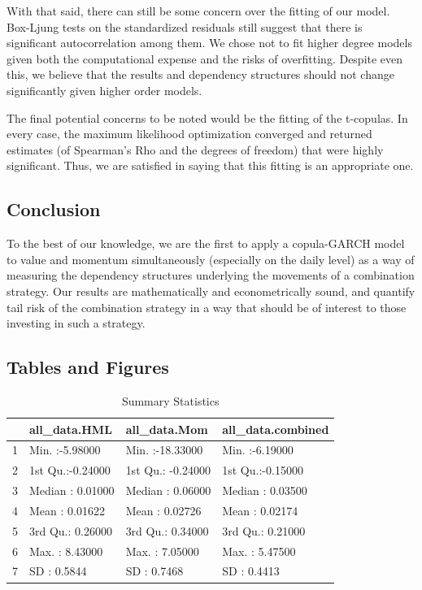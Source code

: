 \documentclass[11pt,letterpaper]{memoir}
\begin{document}
With that said, there can still be some concern over the fitting of our model. Box-Ljung tests on the standardized residuals still suggest that there is significant autocorrelation among them. We chose not to fit higher degree models given both the computational expense and the risks of overfitting. Despite even this, we believe that the results and dependency structures should not change significantly given higher order models. 

The final potential concerns to be noted would be the fitting of the t-copulas. In every case, the maximum likelihood optimization converged and returned estimates (of Spearman's Rho and the degrees of freedom) that were highly significant. Thus, we are satisfied in saying that this fitting is an appropriate one.

\subsection*{Conclusion}
To the best of our knowledge, we are the first to apply a copula-GARCH model to value and momentum simultaneously (especially on the daily level) as a way of measuring the dependency structures underlying the movements of a combination strategy. Our results are mathematically and econometrically sound, and quantify tail risk of the combination strategy in a way that should be of interest to those investing in such a strategy.

\newpage
\subsection*{Tables and Figures}
\begin{table}[ht]
\centering
\caption{Summary Statistics}
\begin{tabular}{rlll}
  \hline
 &  all\_data.HML &  all\_data.Mom & all\_data.combined \\ 
  \hline
1 & Min.   :-5.98000   & Min.   :-18.33000   & Min.   :-6.19000   \\ 
  2 & 1st Qu.:-0.24000   & 1st Qu.: -0.24000   & 1st Qu.:-0.15000   \\ 
  3 & Median : 0.01000   & Median :  0.06000   & Median : 0.03500   \\ 
  4 & Mean   : 0.01622   & Mean   :  0.02726   & Mean   : 0.02174   \\ 
  5 & 3rd Qu.: 0.26000   & 3rd Qu.:  0.34000   & 3rd Qu.: 0.21000   \\ 
  6 & Max.   : 8.43000   & Max.   :  7.05000   & Max.   : 5.47500   \\
  7 & SD     : 0.5844    & SD     :  0.7468    & SD     : 0.4413     \\
   \hline
\end{tabular}
\end{table}
\end{document}
